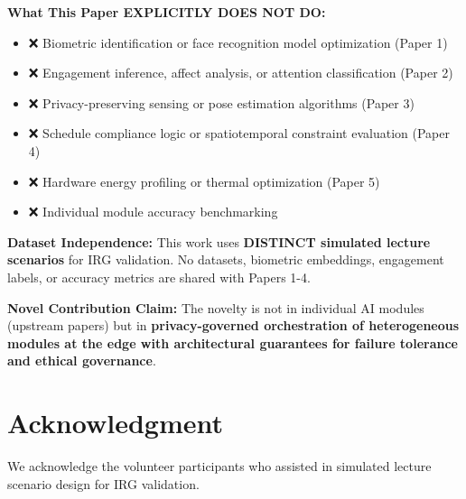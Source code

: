 \documentclass[conference]{IEEEtran}
\begin{document}
\textbf{What This Paper EXPLICITLY DOES NOT DO:}
\begin{itemize}
    \item ❌ Biometric identification or face recognition model optimization (Paper 1)
    \item ❌ Engagement inference, affect analysis, or attention classification (Paper 2)
    \item ❌ Privacy-preserving sensing or pose estimation algorithms (Paper 3)
    \item ❌ Schedule compliance logic or spatiotemporal constraint evaluation (Paper 4)
    \item ❌ Hardware energy profiling or thermal optimization (Paper 5)
    \item ❌ Individual module accuracy benchmarking
\end{itemize}

\textbf{Dataset Independence:}
This work uses \textbf{DISTINCT simulated lecture scenarios} for IRG validation. No datasets, biometric embeddings, engagement labels, or accuracy metrics are shared with Papers 1-4.

\textbf{Novel Contribution Claim:}
The novelty is not in individual AI modules (upstream papers) but in \textbf{privacy-governed orchestration of heterogeneous modules at the edge with architectural guarantees for failure tolerance and ethical governance}.

\section*{Acknowledgment}
We acknowledge the volunteer participants who assisted in simulated lecture scenario design for IRG validation.
\end{document}
